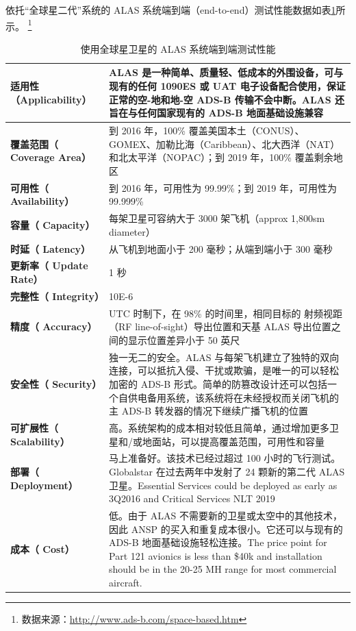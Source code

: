 依托“全球星二代”系统的 ALAS 系统端到端（end-to-end）测试性能数据如表\ref{tab:alas-paras}所示。 \footnote{数据来源：\url{http://www.ads-b.com/space-based.htm}}

\renewcommand\arraystretch{1.5}
\begin{table}[!htb]
\centering
\caption{使用全球星卫星的 ALAS 系统端到端测试性能}
\label{tab:alas-paras}
\begin{tabular}[b]{|p{4cm}<{\raggedleft}|p{11cm}<{\raggedright}|}
\hline
\textbf{适用性
（Applicability）} &
ALAS 是一种简单、质量轻、低成本的外围设备，可与现有的任何 1090ES 或 UAT 电子设备配合使用，保证正常的空-地和地-空 ADS-B 传输不会中断。ALAS 还旨在与任何国家现有的 ADS-B 地面基础设施兼容\\
\hline
\textbf{覆盖范围（
Coverage Area）} &
到 2016 年，100\% 覆盖美国本土（CONUS）、GOMEX、加勒比海（Caribbean）、北大西洋（NAT）和北太平洋（NOPAC）；到 2019 年，100\% 覆盖剩余地区\\
\hline
\textbf{可用性（
Availability）} & 到 2016 年，可用性为 99.99\%；到 2019 年，可用性为 99.999\% \\
\hline
\textbf{容量（
Capacity） }& 每架卫星可容纳大于 3000 架飞机（approx 1,800sm diameter）\\
\hline
\textbf{时延（
Latency）} &  从飞机到地面小于 200 毫秒；从端到端小于 300 毫秒 \\
\hline
\textbf{更新率（
Update Rate）} & 1 秒 \\
\hline
\textbf{完整性（
Integrity）} & 10E-6 \\
\hline
\textbf{精度（
Accuracy）} &
UTC 时制下，在 98\% 的时间里，相同目标的 射频视距（RF line-of-sight）导出位置和天基 ALAS 导出位置之间的显示位置差异小于 50 英尺\\
\hline
\textbf{安全性（
Security）} & 独一无二的安全。ALAS 与每架飞机建立了独特的双向连接，可以抵抗入侵、干扰或欺骗，是唯一的可以轻松加密的 ADS-B 形式。简单的防篡改设计还可以包括一个自供电备用系统，该系统将在未经授权而关闭飞机的主 ADS-B 转发器的情况下继续广播飞机的位置 \\
\hline
\textbf{可扩展性（
Scalability）}  & 高。系统架构的成本相对较低且简单，通过增加更多卫星和/或地面站，可以提高覆盖范围，可用性和容量 \\
\hline
\textbf{部署（
Deployment）} & 马上准备好。该技术已经过超过 100 小时的飞行测试。Globalstar 在过去两年中发射了 24 颗新的第二代 ALAS 卫星。Essential Services could be deployed as early as 3Q2016 and Critical Services NLT 2019\\
\hline
\textbf{成本（
Cost）} & 低。由于 ALAS 不需要新的卫星或太空中的其他技术，因此 ANSP 的买入和重复成本很小。它还可以与现有的 ADS-B 地面基础设施轻松连接。The price point for Part 121 avionics is less than \$40k and installation should be in the 20-25 MH range for most commercial aircraft. \\
\hline
\end{tabular}

\end{table}